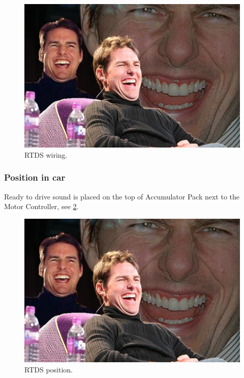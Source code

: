 \begin{figure}[H]
	\centering
	\includegraphics[width=\textwidth]{./img/rtds-wiring.jpg}
	\caption{RTDS wiring.}
	\label{fig:RTDS-wiring}
\end{figure}
\subsubsection{Position in car}

Ready to drive sound is placed on the top of Accumulator Pack next to the Motor Controller, see \ref{fig:RTDS-position}.
\begin{figure}[H]
	\centering
	\includegraphics[width=\textwidth]{./img/rtds-position.jpg}
	\caption{RTDS position.}
	\label{fig:RTDS-position}
\end{figure}